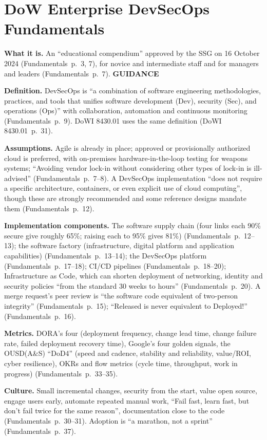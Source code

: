 \documentclass[11pt,letterpaper,twoside,openany]{memoir}
\newcommand{\pg}[2]{{\small(#1~p.~#2)}}          %
\newcommand{\st}[1]{{\sffamily\scriptsize\bfseries #1}}   %
\begin{document}
\section{DoW Enterprise DevSecOps Fundamentals}
\textbf{What it is.} An ``educational compendium'' approved by the SSG on 16 October 2024 \pg{Fundamentals}{3, 7},
for novice and intermediate staff and for managers and leaders \pg{Fundamentals}{7}. \st{GUIDANCE}

\textbf{Definition.} DevSecOps is ``a combination of software engineering methodologies, practices, and tools that
unifies software development (Dev), security (Sec), and operations (Ops)'' with collaboration, automation and continuous
monitoring \pg{Fundamentals}{9}. DoWI 8430.01 uses the same definition \pg{DoWI 8430.01}{31}.

\textbf{Assumptions.} Agile is already in place; approved or provisionally authorized cloud is preferred, with
on-premises hardware-in-the-loop testing for weapons systems; ``Avoiding vendor lock-in without considering other types
of lock-in is ill-advised'' \pg{Fundamentals}{7--8}. A DevSecOps implementation ``does not require a specific
architecture, containers, or even explicit use of cloud computing'', though these are strongly recommended and some
reference designs mandate them \pg{Fundamentals}{12}.

\textbf{Implementation components.} The software supply chain (four links each 90\% secure give roughly 65\%; raising
each to 95\% gives 81\%) \pg{Fundamentals}{12--13}; the software factory (infrastructure, digital platform and
application capabilities) \pg{Fundamentals}{13--14}; the DevSecOps platform \pg{Fundamentals}{17--18}; CI/CD pipelines
\pg{Fundamentals}{18--20}; Infrastructure as Code, which can shorten deployment of networking, identity and security
policies ``from the standard 30 weeks to hours'' \pg{Fundamentals}{20}. A merge request's peer review is ``the software
code equivalent of two-person integrity'' \pg{Fundamentals}{15}; ``Released is never equivalent to Deployed!''
\pg{Fundamentals}{16}.

\textbf{Metrics.} DORA's four (deployment frequency, change lead time, change failure rate, failed deployment recovery
time), Google's four golden signals, the OUSD(A\&S) ``DoD4'' (speed and cadence, stability and reliability,
value/ROI, cyber resilience), OKRs and flow metrics (cycle time, throughput, work in progress)
\pg{Fundamentals}{33--35}.

\textbf{Culture.} Small incremental changes, security from the start, value open source, engage users early, automate
repeated manual work, ``Fail fast, learn fast, but don't fail twice for the same reason'', documentation close to the
code \pg{Fundamentals}{30--31}. Adoption is ``a marathon, not a sprint'' \pg{Fundamentals}{37}.
\end{document}
